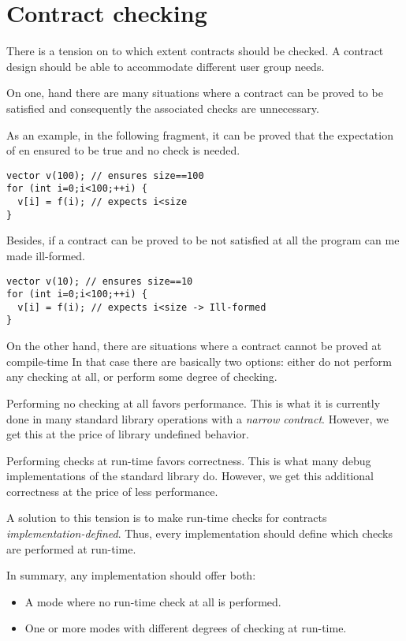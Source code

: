 \section{Contract checking}

There is a tension on to which extent contracts should be checked. A contract
design should be able to accommodate different user group needs.

On one, hand there are many situations where a contract can be proved to be 
satisfied and consequently the associated checks are unnecessary.

As an example, in the following fragment, it can be proved that the expectation
of  en ensured to be true and no check is needed.

\begin{lstlisting}
vector v(100); // ensures size==100
for (int i=0;i<100;++i) {
  v[i] = f(i); // expects i<size
}
\end{lstlisting}

Besides, if a contract can be proved to be not satisfied at all the program
can me made ill-formed.

\begin{lstlisting}
vector v(10); // ensures size==10
for (int i=0;i<100;++i) {
  v[i] = f(i); // expects i<size -> Ill-formed
}
\end{lstlisting}

On the other hand, there are situations where a contract cannot be proved at
compile-time In that case there are basically two options: either do not
perform any checking at all, or perform some degree of checking.

Performing no checking at all favors performance. This is what it is currently
done in many standard library operations with a \emph{narrow contract}. However,
we get this at the price of library undefined behavior.

Performing checks at run-time favors correctness. This is what many debug
implementations of the standard library do.  However, we get this additional
correctness at the price of less performance.

A solution to this tension is to make run-time checks for contracts 
\emph{implementation-defined}. Thus, every implementation should define 
which checks are performed at run-time.

In summary, any implementation should offer both:

\begin{itemize}

\item A mode where no run-time check at all is performed.

\item One or more modes with different degrees of checking at run-time.

\end{itemize}

